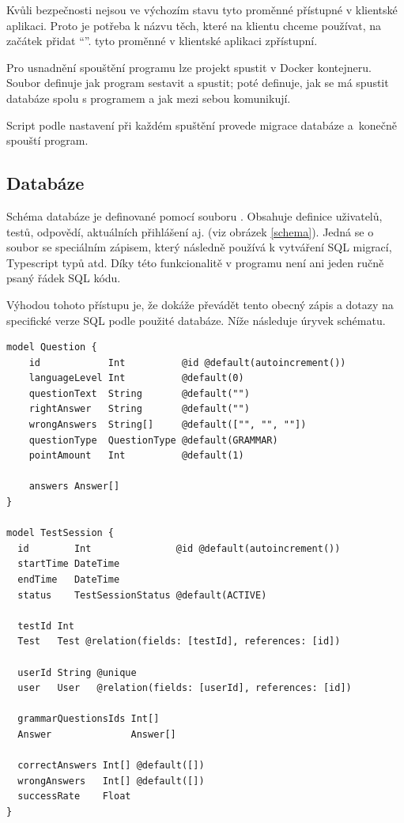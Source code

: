 Kvůli bezpečnosti nejsou ve výchozím stavu tyto proměnné přístupné v klientské aplikaci. Proto je potřeba k názvu těch, které na klientu chceme používat, na začátek přidat \enquote{}.  tyto proměnné v klientské aplikaci zpřístupní.

Pro usnadnění spouštění programu lze projekt spustit v Docker kontejneru. Soubor  definuje jak program sestavit a spustit;  poté definuje, jak se má spustit databáze spolu s programem a jak mezi sebou komunikují. \cite{docker}

Script  podle nastavení při každém spuštění provede migrace databáze a~konečně spouští program.

\subsection{Databáze}

Schéma databáze je definované pomocí souboru . Obsahuje definice uživatelů, testů, odpovědí, aktuálních přihlášení aj. (viz obrázek \ref{schema}). Jedná se o soubor se speciálním zápisem, který následně  používá k vytváření SQL migrací, Typescript typů atd. Díky této funkcionalitě v programu není ani jeden ručně psaný řádek SQL kódu.

Výhodou tohoto přístupu je, že  dokáže převádět tento obecný zápis a dotazy na specifické verze SQL podle použité databáze. \cite{prisma} Níže následuje úryvek schématu.

\begin{lstlisting}[language=Prisma, caption={Úryvek \M{/prisma/scheme.prisma}; schéma databáze.}]
model Question {
    id            Int          @id @default(autoincrement())
    languageLevel Int          @default(0)
    questionText  String       @default("")
    rightAnswer   String       @default("")
    wrongAnswers  String[]     @default(["", "", ""])
    questionType  QuestionType @default(GRAMMAR)
    pointAmount   Int          @default(1)

    answers Answer[]
}

model TestSession {
  id        Int               @id @default(autoincrement())
  startTime DateTime
  endTime   DateTime
  status    TestSessionStatus @default(ACTIVE)

  testId Int
  Test   Test @relation(fields: [testId], references: [id])

  userId String @unique
  user   User   @relation(fields: [userId], references: [id])

  grammarQuestionsIds Int[]
  Answer              Answer[]

  correctAnswers Int[] @default([])
  wrongAnswers   Int[] @default([])
  successRate    Float
}
\end{lstlisting}


